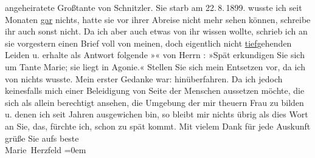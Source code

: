 \begin{ledgroupsized}[t]{13cm}
{{{                  angeheiratete Großtante von Schnitzler. Sie
                  starb am 22. 8. 1899.}}}\label{K_L02591-13h} wusste ich seit Monaten \uline{gar} nichts,
               hatte sie vor ihrer Abreise nicht mehr sehen können, schreibe ihr auch sonst nicht.
               Da ich aber auch etwas von ihr wissen wollte, {\pb}schrieb ich
               an sie vorgestern einen Brief voll von meinen, doch eigentlich nicht \uline{tief}gehenden Leiden u. erhalte als Antwort folgende
                  »\label{K_L02591-44v}\label{K_L02591-44h}« von Herrn \label{K_L02591-5v}\label{K_L02591-5h}: »Spät erkundigen Sie sich um Tante Marie; sie liegt in Agonie.« Stellen Sie sich mein
               Entsetzen vor, da ich von nichts wusste. Mein erster Gedanke war: hinüberfahren. Da
               ich {\pb}jedoch keinesfalls mich einer Beleidigung von Seite
               der Menschen aussetzen möchte, die sich als allein berechtigt ansehen, die Umgebung
               der mir theuern Frau zu bilden
               u. denen ich seit Jahren ausgewichen bin, so bleibt mir nichts übrig als dies Wort an
               Sie, das, fürchte ich, schon zu spät kommt. Mit vielem Dank für jede
               Auskunft\pend
           \pstart
           grüße Sie aufs beste {\\[\baselineskip]}\spacefill\mbox{Marie Herzfeld}\pend
           \leftskip=0em{}
         
         \endnumbering{}\end{ledgroupsized}  \newcommand{\dateiname}{L02591}\newcommand{\titel}{Marie Herzfeld an Arthur Schnitzler, 23. 8. 1899}\newcommand{\editorInnen}{Martin Anton Müller und Laura Untner}
      